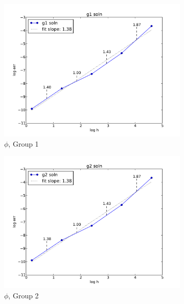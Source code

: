 \documentclass{mc2015}
\begin{document}
\begin{figure}[h]
\centering
  \begin{subfigure}[b]{0.3 \textwidth}
   \includegraphics[width=\textwidth]{g1}
   \caption{$\phi$, Group 1}
   \label{g1conv}
  \end{subfigure}
  \begin{subfigure}[b]{0.3 \textwidth}
   \includegraphics[width=\textwidth]{g2}
   \caption{$\phi$, Group 2}
   \label{g2conv}
  \end{subfigure}
  \begin{subfigure}[b]{0.3 \textwidth}

\end{subfigure}
\end{figure}
\end{document}
